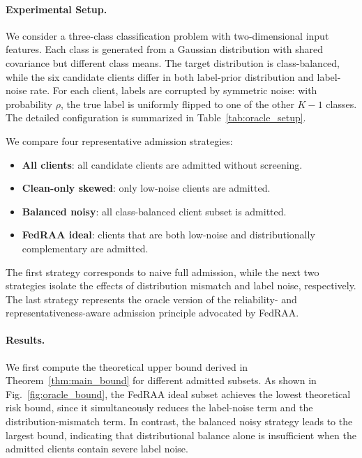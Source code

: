 \documentclass[conference]{IEEEtran}
\theoremstyle{definition}
\theoremstyle{remark}
\begin{document}
\paragraph{Experimental Setup.}
We consider a three-class classification problem with two-dimensional input features. 
Each class is generated from a Gaussian distribution with shared covariance but different class means. 
The target distribution is class-balanced, while the six candidate clients differ in both label-prior distribution and label-noise rate. 
For each client, labels are corrupted by symmetric noise: with probability $\rho$, the true label is uniformly flipped to one of the other $K-1$ classes. 
The detailed configuration is summarized in Table~\ref{tab:oracle_setup}.

We compare four representative admission strategies:
\begin{itemize}
    \item \textbf{All clients}: all candidate clients are admitted without screening.
    \item \textbf{Clean-only skewed}: only low-noise clients are admitted.
    \item \textbf{Balanced noisy}: all class-balanced client subset is admitted.
    \item \textbf{FedRAA ideal}: clients that are both low-noise and distributionally complementary are admitted.
\end{itemize}
The first strategy corresponds to naive full admission, while the next two strategies isolate the effects of distribution mismatch and label noise, respectively. 
The last strategy represents the oracle version of the reliability- and representativeness-aware admission principle advocated by FedRAA.

\paragraph{Results.}
We first compute the theoretical upper bound derived in Theorem~\ref{thm:main_bound} for different admitted subsets. 
As shown in Fig.~\ref{fig:oracle_bound}, the FedRAA ideal subset achieves the lowest theoretical risk bound, since it simultaneously reduces the label-noise term and the distribution-mismatch term.
In contrast, the balanced noisy strategy leads to the largest bound, indicating that distributional balance alone is insufficient when the admitted clients contain severe label noise.
\end{document}
